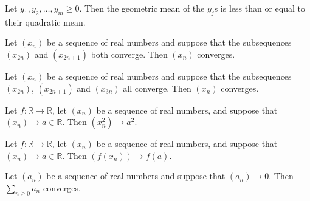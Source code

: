 \begin{chapex} %
Let $y_1, y_2, \dots, y_m \ge 0$. Then the geometric mean of the $y_j$s is less than or equal to their quadratic mean.
\end{chapex}

\begin{chapex} %
Let $(x_n)$ be a sequence of real numbers and suppose that the subsequences $(x_{2n})$ and $(x_{2n+1})$ both converge. Then $(x_n)$ converges.
\end{chapex}

\begin{chapex} %
Let $(x_n)$ be a sequence of real numbers and suppose that the subsequences $(x_{2n})$, $(x_{2n+1})$ and $(x_{3n})$ all converge. Then $(x_n)$ converges.
\end{chapex}

\begin{chapex} %
Let $f : \mathbb{R} \to \mathbb{R}$, let $(x_n)$ be a sequence of real numbers, and suppose that $(x_n) \to a \in \mathbb{R}$. Then $(x_n^2) \to a^2$.
\end{chapex}

\begin{chapex} %
Let $f : \mathbb{R} \to \mathbb{R}$, let $(x_n)$ be a sequence of real numbers, and suppose that $(x_n) \to a \in \mathbb{R}$. Then $(f(x_n)) \to f(a)$.
\end{chapex}

\begin{chapex} %
\label{cqRealNumbersASNEnd}
Let $(a_n)$ be a sequence of real numbers and suppose that $(a_n) \to 0$. Then $\sum_{n \ge 0} a_n$ converges.
\end{chapex}